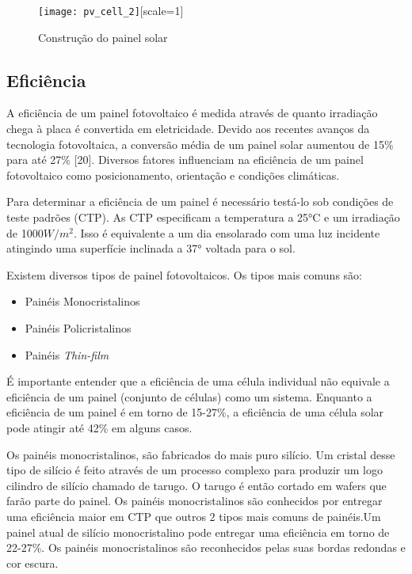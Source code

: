 \begin{figure}[ht!]
	\centering
	\caption{Construção do painel solar}
	\label{fig:pv_cell_2}
	\texttt{[image: pv\_cell\_2]}[scale=1]
\end{figure}

\subsection{Eficiência}

A eficiência de um painel fotovoltaico é medida através de quanto irradiação chega à placa é convertida em eletricidade. Devido aos recentes avanços da tecnologia fotovoltaica, a conversão média de um painel solar aumentou de 15\% para até 27\% [20]. Diversos fatores influenciam na eficiência de um painel fotovoltaico como posicionamento, orientação e condições climáticas.

Para determinar a eficiência de um painel é necessário testá-lo sob condições de teste padrões (CTP). As CTP especificam a temperatura a 25°C e um irradiação de 1000\mbox{$W/m^2$}. Isso é equivalente a um dia ensolarado com uma luz incidente atingindo uma superfície inclinada a 37° voltada para o sol.

Existem diversos tipos de painel fotovoltaicos. Os tipos mais comuns são: 

\begin{itemize}
	\item Painéis Monocristalinos
	\item Painéis Policristalinos
	\item Painéis \emph{Thin-film}
\end{itemize}

É importante entender que a eficiência de uma célula individual não equivale a eficiência de um painel (conjunto de células) como um sistema. Enquanto a eficiência de um painel é em torno de 15-27\%, a eficiência de uma célula solar pode atingir até 42\% em alguns casos.

Os painéis monocristalinos, são fabricados do mais puro silício. Um cristal desse tipo de silício é feito através de um processo complexo para produzir um logo cilindro de silício chamado de tarugo. O tarugo é então cortado em wafers que farão parte do painel. Os painéis monocristalinos são conhecidos por entregar uma eficiência maior em CTP que outros 2 tipos mais comuns de painéis.Um painel atual de silício monocristalino pode entregar uma eficiência em torno de 22-27\%. Os painéis monocristalinos são reconhecidos pelas suas bordas redondas e cor escura.

